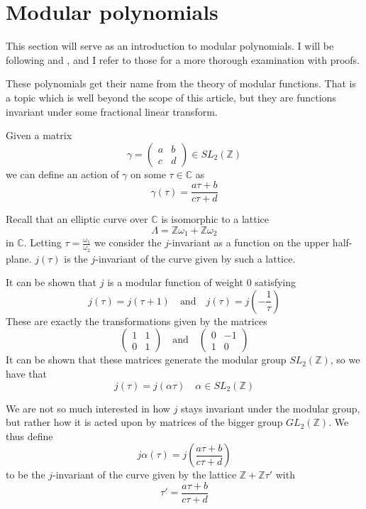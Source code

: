 \section{Modular polynomials}
This section will serve as an introduction to modular polynomials.
I will be following \cite{Lang2} and \cite{AAEC}, and I refer to those for a more thorough examination
with proofs.

These polynomials get their name from the theory of modular functions. That is a topic which is
well beyond the scope of this article, but they are functions invariant under some fractional linear
transform. 

Given a matrix
$$ \gamma = \begin{pmatrix}
 a & b \\ c & d
\end{pmatrix} \in SL_2(\mathbb{Z})$$
we can define an action of $\gamma$ on some $\tau \in \mathbb{C}$ as
$$\gamma(\tau) = \frac{a\tau + b}{c\tau + d} $$

Recall that an elliptic curve over $\mathbb{C}$ is isomorphic to a lattice
$$\Lambda = \mathbb{Z}\omega_1 + \mathbb{Z}\omega_2$$ in $\mathbb{C}$.
Letting $\tau = \frac{\omega_1}{\omega_2}$ we consider the $j$-invariant as a function
on the upper half-plane. $j(\tau)$ is the $j$-invariant of the curve given by such a lattice.

It can be shown that $j$ is a modular function of weight $0$ satisfying
$$ j(\tau) = j(\tau + 1) \quad \text{and} \quad j(\tau) = j(-\frac{1}{\tau}) $$
These are exactly the transformations given by the matrices
$$ \begin{pmatrix} 1 & 1 \\ 0 & 1 \end{pmatrix} \quad \text{and} \quad
   \begin{pmatrix} 0 & -1 \\ 1 & 0 \end{pmatrix} $$
It can be shown that these matrices generate the modular group $SL_2(\mathbb{Z})$,
so we have that
$$j(\tau) = j(\alpha \tau) \quad \alpha \in SL_2(\mathbb{Z}) $$

We are not so much interested in how $j$ stays invariant under the modular group,
but rather how it is acted upon by matrices of the bigger group $GL_2(\mathbb{Z})$.
We thus define
$$ j \alpha(\tau) = j\left(\frac{a\tau + b}{c\tau + d}\right) $$
to be the $j$-invariant of the curve given by the lattice $\mathbb{Z}+\mathbb{Z}\tau'$
with $$\tau' = \frac{a\tau + b}{c\tau + d}$$

